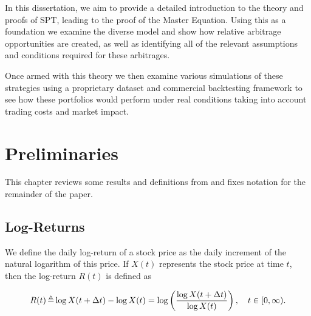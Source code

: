 \documentclass[british]{amsart} \usepackage{lmodern}
\numberwithin{equation}{section} \numberwithin{figure}{section}
\theoremstyle{plain} \newtheorem{thm}{\protect\theoremname}[section]
\theoremstyle{definition} \newtheorem{defn}[thm]{\protect\definitionname}
\theoremstyle{plain} \newtheorem{assumption}[thm]{\protect\assumptionname}
\theoremstyle{plain} \newtheorem{lem}[thm]{\protect\lemmaname}
\theoremstyle{plain} \newtheorem{prop}[thm]{\protect\propositionname}
\theoremstyle{remark} \newtheorem{rem}[thm]{\protect\remarkname}
\theoremstyle{plain} \newtheorem{cor}[thm]{\protect\corollaryname}
\newcommand{\defeq}{\mathop{\triangleq}} \newcommand{\almostsurely}{\text{a.s.}}
\begin{document}
In this dissertation, we aim to provide a detailed introduction to the theory
and proofs of SPT, leading to the proof of the Master Equation. Using this as a
foundation we examine the diverse model and show how relative arbitrage
opportunities are created, as well as identifying all of the relevant
assumptions and conditions required for these arbitrages.

Once armed with this theory we then examine various simulations of these
strategies using a proprietary dataset and commercial backtesting framework to
see how these portfolios would perform under real conditions taking into account
trading costs and market impact.


\newpage
\section{Preliminaries}

This chapter reviews some results and definitions from and fixes notation for
the remainder of the paper.

\subsection{Log-Returns}

We define the daily log-return of a stock price as the daily increment
of the natural logarithm of this price. If $X(t)$ represents the stock
price at time $t$, then the log-return $R(t)$ is defined as

\begin{equation}
  R(t) 
    \defeq \log{X(t+\Delta t)} - \log{X(t)} 
    = \log \left( \frac{\log{X(t+\Delta t)}}{\log{X(t)}} \right),
  \quad \ranget.
\end{equation}
\end{document}
